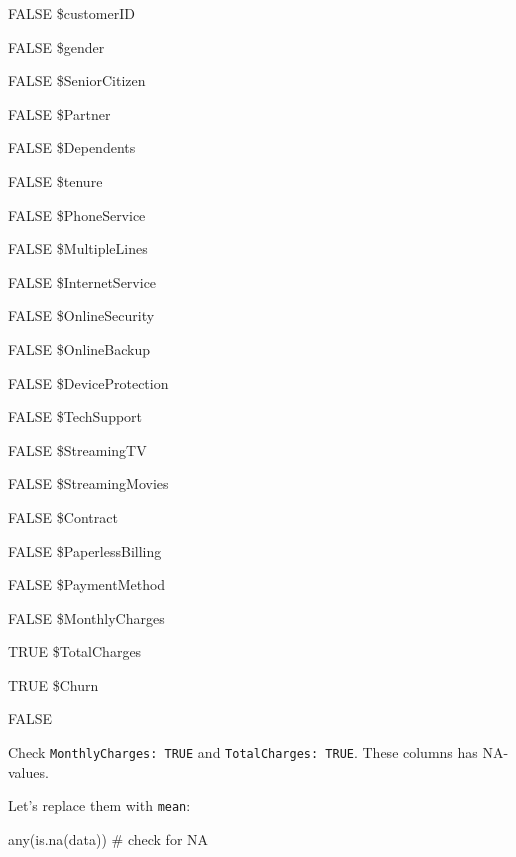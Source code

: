 \documentclass[
  letterpaper,
  DIV=11,
  numbers=noendperiod]{scrreprt}
\newenvironment{Shaded}{\begin{snugshade}}{\end{snugshade}}
\newcommand{\AttributeTok}[1]{\textcolor[rgb]{0.40,0.45,0.13}{#1}}
\newcommand{\CommentTok}[1]{\textcolor[rgb]{0.37,0.37,0.37}{#1}}
\newcommand{\FunctionTok}[1]{\textcolor[rgb]{0.28,0.35,0.67}{#1}}
\newcommand{\NormalTok}[1]{\textcolor[rgb]{0.00,0.23,0.31}{#1}}
\newcommand{\OtherTok}[1]{\textcolor[rgb]{0.00,0.23,0.31}{#1}}
\newcommand{\SpecialCharTok}[1]{\textcolor[rgb]{0.37,0.37,0.37}{#1}}
\newcommand{\StringTok}[1]{\textcolor[rgb]{0.13,0.47,0.30}{#1}}
\providecommand{\tightlist}{%
  \setlength{\itemsep}{0pt}\setlength{\parskip}{0pt}}\usepackage{longtable,booktabs,array}
\begin{document}
\begin{description}
\tightlist
\item[\$X]
FALSE \$customerID

FALSE \$gender

FALSE \$SeniorCitizen

FALSE \$Partner

FALSE \$Dependents

FALSE \$tenure

FALSE \$PhoneService

FALSE \$MultipleLines

FALSE \$InternetService

FALSE \$OnlineSecurity

FALSE \$OnlineBackup

FALSE \$DeviceProtection

FALSE \$TechSupport

FALSE \$StreamingTV

FALSE \$StreamingMovies

FALSE \$Contract

FALSE \$PaperlessBilling

FALSE \$PaymentMethod

FALSE \$MonthlyCharges

TRUE \$TotalCharges

TRUE \$Churn

FALSE
\end{description}

Check \texttt{MonthlyCharges:\ TRUE} and \texttt{TotalCharges:\ TRUE}.
These columns has NA-values.

Let's replace them with \texttt{mean}:

\begin{Shaded}
\end{Shaded}

\begin{Shaded}
\begin{Highlighting}[]
\FunctionTok{any}\NormalTok{(}\FunctionTok{is.na}\NormalTok{(data)) }\CommentTok{\# check for NA}
\end{Highlighting}
\end{Shaded}
\end{document}

